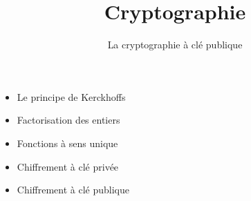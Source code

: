 



\newcommand{\Python}{\texttt{Python}}
\renewcommand{\evidence}[1]{{\color{blue}\textbf{#1}}}

\usepackage{textcomp}

\usepackage{listings}



\newcommand{\codeinline}[1]{\lstinline!#1!}


\newcommand{\prive}[1]{{\bf\color{coul_prive} #1}}
\newcommand{\public}[1]{{\bf\color{coul_public} #1}}






\title{{\bf Cryptographie}}
\subtitle{La cryptographie à clé publique}

\begin{frame}
  
  \debutmontitre

  \pause

{\footnotesize
\hfill
{}
\begin{minipage}{0.6\textwidth}
  \begin{itemize}
    \item<3-> Le principe de Kerckhoffs
    \item<4-> Factorisation des entiers
    \item<5-> Fonctions à sens unique
    \item<6-> Chiffrement à clé privée
    \item<7-> Chiffrement à clé publique
  \end{itemize}
\end{minipage}
}

\end{frame}

\setcounter{framenumber}{0}


